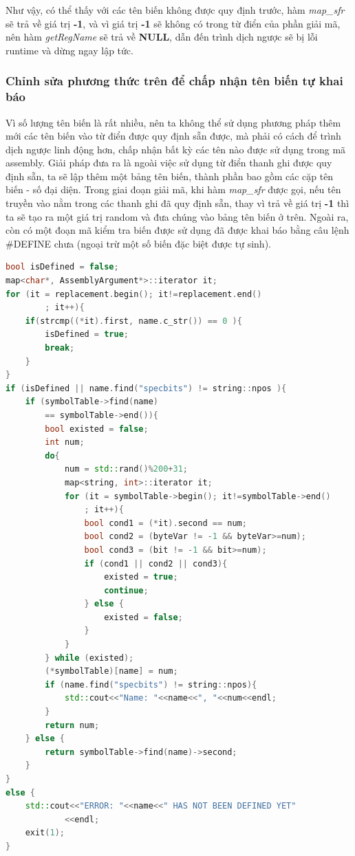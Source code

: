 Như vậy, có thể thấy với các tên biến không được quy định trước, hàm \textit{map\_sfr} sẽ trả về giá trị \textbf{-1}, và vì giá trị \textbf{-1} sẽ không có trong từ điển của phần giải mã, nên hàm \textit{getRegName} sẽ trả về \textbf{NULL}, dẫn đến trình dịch ngược sẽ bị lỗi runtime và dừng ngay lập tức.\\


\subsubsection{Chỉnh sửa phương thức trên để chấp nhận tên biến tự khai báo}
Vì số lượng tên biến là rất nhiều, nên ta không thể sử dụng phương pháp thêm mới các tên biến vào từ điển được quy định sẵn được, mà phải có cách để trình dịch ngược linh động hơn, chấp nhận bất kỳ các tên nào được sử dụng trong mã assembly. Giải pháp đưa ra là ngoài việc sử dụng từ điển thanh ghi được quy định sẵn, ta sẽ lập thêm một bảng tên biến, thành phần bao gồm các cặp tên biến - số đại diện. Trong giai đoạn giải mã, khi hàm \textit{map\_sfr} được gọi, nếu tên truyền vào nằm trong các thanh ghi đã quy định sẵn, thay vì trả về giá trị \textbf{-1} thì ta sẽ tạo ra một giá trị random và đưa chúng vào bảng tên biến ở trên. Ngoài ra, còn có một đoạn mã kiểm tra biến được sử dụng đã được khai báo bằng câu lệnh \#DEFINE chưa (ngoại trừ một số biến đặc biệt được tự sinh). \\
\begin{lstlisting}[caption={Phần mã mới được bổ sung trong hàm map\_sfr},label={list:listmapsfrnew},language=c++]
bool isDefined = false;
map<char*, AssemblyArgument*>::iterator it;
for (it = replacement.begin(); it!=replacement.end()
		; it++){
	if(strcmp((*it).first, name.c_str()) == 0 ){
		isDefined = true;
		break;
	}
}
if (isDefined || name.find("specbits") != string::npos ){
	if (symbolTable->find(name) 
		== symbolTable->end()){
		bool existed = false;
		int num;
		do{
			num = std::rand()%200+31;
			map<string, int>::iterator it;
			for (it = symbolTable->begin(); it!=symbolTable->end()
				; it++){
				bool cond1 = (*it).second == num;
				bool cond2 = (byteVar != -1 && byteVar>=num);
				bool cond3 = (bit != -1 && bit>=num);
				if (cond1 || cond2 || cond3){
					existed = true;
					continue;
				} else {
					existed = false;
				}	
			}
		} while (existed); 
		(*symbolTable)[name] = num;
		if (name.find("specbits") != string::npos){
			std::cout<<"Name: "<<name<<", "<<num<<endl;
		}	
		return num;
	} else {
		return symbolTable->find(name)->second;
	}
}
else {
	std::cout<<"ERROR: "<<name<<" HAS NOT BEEN DEFINED YET"
			<<endl;
	exit(1);
}
\end{lstlisting}
